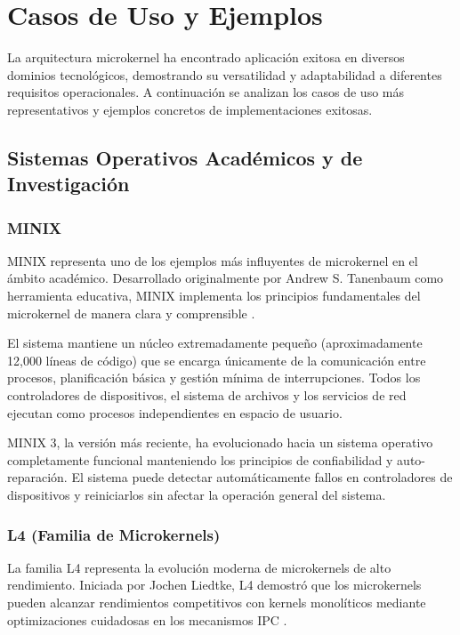 \documentclass[12pt,a4paper]{article}
\begin{document}
\section{Casos de Uso y Ejemplos}

La arquitectura microkernel ha encontrado aplicación exitosa en diversos dominios tecnológicos, demostrando su versatilidad y adaptabilidad a diferentes requisitos operacionales. A continuación se analizan los casos de uso más representativos y ejemplos concretos de implementaciones exitosas.

\subsection{Sistemas Operativos Académicos y de Investigación}

\subsubsection{MINIX}

MINIX representa uno de los ejemplos más influyentes de microkernel en el ámbito académico. Desarrollado originalmente por Andrew S. Tanenbaum como herramienta educativa, MINIX implementa los principios fundamentales del microkernel de manera clara y comprensible \cite{minixdoc}. 

El sistema mantiene un núcleo extremadamente pequeño (aproximadamente 12,000 líneas de código) que se encarga únicamente de la comunicación entre procesos, planificación básica y gestión mínima de interrupciones. Todos los controladores de dispositivos, el sistema de archivos y los servicios de red ejecutan como procesos independientes en espacio de usuario.

MINIX 3, la versión más reciente, ha evolucionado hacia un sistema operativo completamente funcional manteniendo los principios de confiabilidad y auto-reparación. El sistema puede detectar automáticamente fallos en controladores de dispositivos y reiniciarlos sin afectar la operación general del sistema.

\subsubsection{L4 (Familia de Microkernels)}

La familia L4 representa la evolución moderna de microkernels de alto rendimiento. Iniciada por Jochen Liedtke, L4 demostró que los microkernels pueden alcanzar rendimientos competitivos con kernels monolíticos mediante optimizaciones cuidadosas en los mecanismos IPC \cite{liedtke1995microkernel}.
\end{document}
